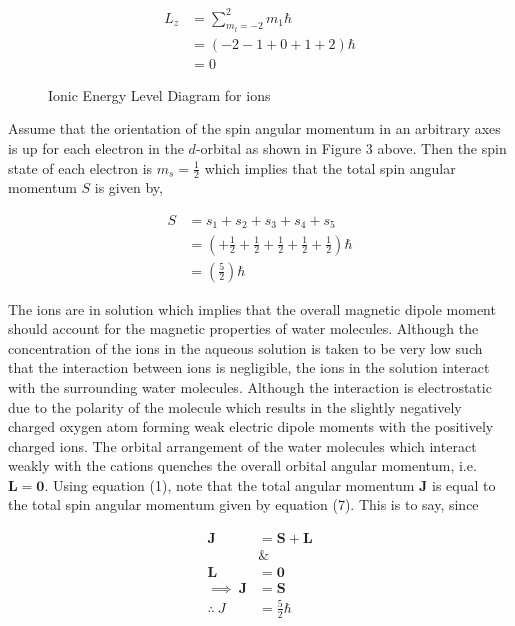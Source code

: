 \documentclass[a4paper,11pt]{article}
\begin{document}
\begin{align}
L_z	& = \sum_{m_l=-2}^{2} m_{1} \hbar \nonumber\\
	& = (-2 -1 +0 +1 +2)\hbar\nonumber\\
	& = 0
\end{align}

\begin{figure}
{}
\caption{Ionic Energy Level Diagram for  ions}
\label{Fig:3}
\end{figure}

Assume that the orientation of the spin angular momentum in an arbitrary axes is up for each electron in the $d$-orbital as shown in Figure 3 above. Then the spin state of each electron is $m_s = \frac{1}{2}$ which implies that the total spin angular momentum $S$ is given by,

\begin{align}
S	& = s_1 + s_2 + s_3 + s_4 +s_5\nonumber\\
	& = (+ \frac{1}{2} + \frac{1}{2} + \frac{1}{2} + \frac{1}{2} + \frac{1}{2})\hbar\nonumber\\
	& = (\frac{5}{2})\hbar
\end{align}   

The ions are in solution which implies that the overall magnetic dipole moment should account for the magnetic properties of water molecules. Although the concentration of the ions in the aqueous solution is taken to be very low such that the interaction between ions is negligible, the ions in the solution interact with the surrounding water molecules. Although the interaction is electrostatic due to the polarity of the  molecule which results in the slightly negatively charged oxygen atom forming weak electric dipole moments with the positively charged  ions. The orbital arrangement of the water molecules which interact weakly with the cations quenches the overall orbital angular momentum, i.e. $\mathbf{L} = \mathbf{0}$. Using equation (1), note that the total angular momentum $\mathbf{J}$ is equal to the total spin angular momentum given by equation (7). This is to say, since

\begin{align}
\mathbf{J}				& = \mathbf{S} + \mathbf{L}\nonumber\\
						& \&\nonumber\\
\mathbf{L}				& = \mathbf{0}\nonumber\\
\implies~\mathbf{J}		& = \mathbf{S}\nonumber\\
\therefore~J			& = \frac{5}{2}\hbar\nonumber
\end{align}
\end{document}
